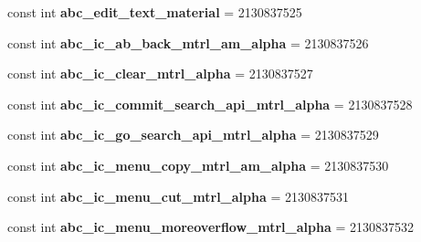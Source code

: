 \begin{DoxyCompactItemize}
const int {\bfseries abc\+\_\+edit\+\_\+text\+\_\+material} = 2130837525
\item 
\mbox{\label{class_sample_app_1_1_droid_1_1_resource_1_1_drawable_af7facca2c12ce82d666665c8f1e59f7e}} 
const int {\bfseries abc\+\_\+ic\+\_\+ab\+\_\+back\+\_\+mtrl\+\_\+am\+\_\+alpha} = 2130837526
\item 
\mbox{\label{class_sample_app_1_1_droid_1_1_resource_1_1_drawable_a147214d8e294996822138d4580d73a98}} 
const int {\bfseries abc\+\_\+ic\+\_\+clear\+\_\+mtrl\+\_\+alpha} = 2130837527
\item 
\mbox{\label{class_sample_app_1_1_droid_1_1_resource_1_1_drawable_a9330b7588d0ebbb7c588f1e1de3dfde7}} 
const int {\bfseries abc\+\_\+ic\+\_\+commit\+\_\+search\+\_\+api\+\_\+mtrl\+\_\+alpha} = 2130837528
\item 
\mbox{\label{class_sample_app_1_1_droid_1_1_resource_1_1_drawable_a8880a89d7cc3533acc572418e0886cd6}} 
const int {\bfseries abc\+\_\+ic\+\_\+go\+\_\+search\+\_\+api\+\_\+mtrl\+\_\+alpha} = 2130837529
\item 
\mbox{\label{class_sample_app_1_1_droid_1_1_resource_1_1_drawable_afac57ed90eb3b1dd82558057cfcdf66f}} 
const int {\bfseries abc\+\_\+ic\+\_\+menu\+\_\+copy\+\_\+mtrl\+\_\+am\+\_\+alpha} = 2130837530
\item 
\mbox{\label{class_sample_app_1_1_droid_1_1_resource_1_1_drawable_a2da98c4178c1c82c3ad7d4bfe1d1fa54}} 
const int {\bfseries abc\+\_\+ic\+\_\+menu\+\_\+cut\+\_\+mtrl\+\_\+alpha} = 2130837531
\item 
\mbox{\label{class_sample_app_1_1_droid_1_1_resource_1_1_drawable_a6216a76bc6a0f336224b1ca45eeb8509}} 
const int {\bfseries abc\+\_\+ic\+\_\+menu\+\_\+moreoverflow\+\_\+mtrl\+\_\+alpha} = 2130837532
\item 
\mbox{\label{class_sample_app_1_1_droid_1_1_resource_1_1_drawable_a16f795ac260da6a2d04e6103a4496330}} 

\end{DoxyCompactItemize}
